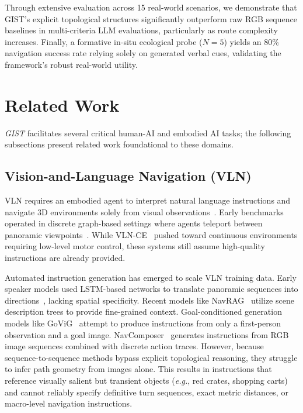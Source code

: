 \documentclass[sigconf,anonymous,review]{acmart}
\begin{document}
Through extensive evaluation across 15 real-world scenarios, we demonstrate that GIST's explicit topological structures significantly outperform raw RGB sequence baselines in multi-criteria LLM evaluations, particularly as route complexity increases. Finally, a formative in-situ ecological probe ($N=5$) yields an 80\% navigation success rate relying solely on generated verbal cues, validating the framework's robust real-world utility.


\section{Related Work}
\emph{GIST} facilitates several critical human-AI and embodied AI tasks; the following subsections present related work foundational to these domains. 

\subsection{Vision-and-Language Navigation (VLN)}
VLN requires an embodied agent to interpret natural language instructions and navigate 3D environments solely from visual observations~\cite{anderson2018vln}. Early benchmarks operated in discrete graph-based settings where agents teleport between panoramic viewpoints~\cite{qi2020reverie}. While VLN-CE~\cite{krantz2020vlnce} pushed toward continuous environments requiring low-level motor control, these systems still assume high-quality instructions are already provided.

Automated instruction generation has emerged to scale VLN training data. Early speaker models used LSTM-based networks to translate panoramic sequences into directions~\cite{fried2018speaker}, lacking spatial specificity. Recent models like NavRAG~\cite{wang2025navrag} utilize scene description trees to provide fine-grained context. Goal-conditioned generation models like GoViG~\cite{wu2025govig} attempt to produce instructions from only a first-person observation and a goal image. NavComposer~\cite{he2025navcomposer} generates instructions from RGB image sequences combined with discrete action traces. However, because sequence-to-sequence methods bypass explicit topological reasoning, they struggle to infer path geometry from images alone. This results in instructions that reference visually salient but transient objects (\textit{e.g.}, red crates, shopping carts) and cannot reliably specify definitive turn sequences, exact metric distances, or macro-level navigation instructions.
\end{document}
